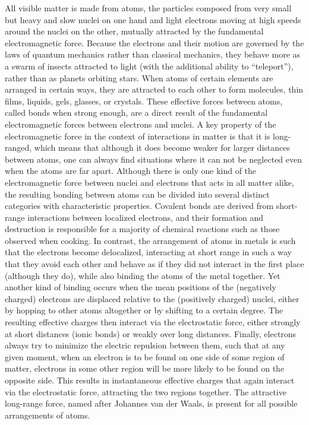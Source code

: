 All visible matter is made from atoms, the particles composed from very small but heavy and slow nuclei on one hand and light electrons moving at high speeds around the nuclei on the other, mutually attracted by the fundamental electromagnetic force.
Because the electrons and their motion are governed by the laws of quantum mechanics rather than classical mechanics, they behave more as a swarm of insects attracted to light (with the additional ability to ``teleport''), rather than as planets orbiting stars.
When atoms of certain elements are arranged in certain ways, they are attracted to each other to form molecules, thin films, liquids, gels, glasses, or crystals.
These effective forces between atoms, called bonds when strong enough, are a direct result of the fundamental electromagnetic forces between electrons and nuclei.
A key property of the electromagnetic force in the context of interactions in matter is that it is long-ranged, which means that although it does become weaker for larger distances between atoms, one can always find situations where it can not be neglected even when the atoms are far apart.
Although there is only one kind of the electromagnetic force between nuclei and electrons that acts in all matter alike, the resulting bonding between atoms can be divided into several distinct categories with characteristic properties.
Covalent bonds are derived from short-range interactions between localized electrons, and their formation and destruction is responsible for a majority of chemical reactions such as those observed when cooking.
In contrast, the arrangement of atoms in metals is such that the electrons become delocalized, interacting at short range in such a way that they avoid each other and behave as if they did not interact in the first place (although they do), while also binding the atoms of the metal together.
Yet another kind of binding occurs when the mean positions of the (negatively charged) electrons are displaced relative to the (positively charged) nuclei, either by hopping to other atoms altogether or by shifting to a certain degree.
The resulting effective charges then interact via the electrostatic force, either strongly at short distances (ionic bonds) or weakly over long distances.
Finally, electrons always try to minimize the electric repulsion between them, such that at any given moment, when an electron is to be found on one side of some region of matter, electrons in some other region will be more likely to be found on the opposite side.
This results in instantaneous effective charges that again interact via the electrostatic force, attracting the two regions together.
The attractive long-range force, named after Johannes van der Waals, is present for all possible arrangements of atoms.

